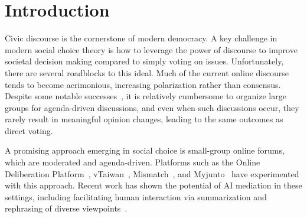 \section{Introduction}
Civic discourse is the cornerstone of modern democracy. A key challenge in modern social choice theory is how to leverage the power of discourse to %
improve societal decision making compared to simply voting on issues. Unfortunately, there are several roadblocks to this ideal. Much of the current online discourse tends to become acrimonious, increasing polarization rather than consensus. Despite some notable successes~\cite{Ingham18,fishkin1991democracy}, it is relatively cumbersome to organize large groups for agenda-driven discussions, and even when such discussions occur, they rarely result in meaningful opinion changes, leading to the same outcomes as direct voting. 

A promising approach emerging in social choice is small-group online forums, which are moderated and agenda-driven. Platforms such as the Online Deliberation Platform~\cite{stanfordd}, vTaiwan~\cite{vTaiwan}, Mismatch~\cite{mismatch}, and Myjunto~\cite{myjunto} have experimented with this approach. Recent work has shown the potential of AI mediation in these settings, including facilitating human interaction via summarization and rephrasing of diverse viewpoints~\cite{ChrisBail,ChatBot,stanfordd,LLM,ashkinaze2024}. %





